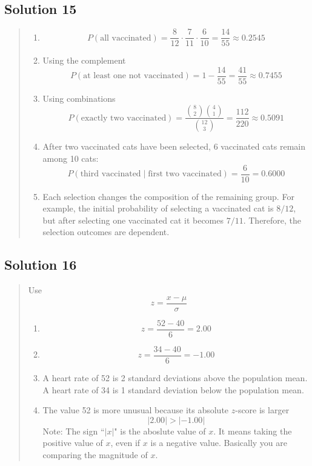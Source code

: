 \documentclass[10pt,letterpaper]{article}
\newcommand{\solutionheading}[1]{%
  \subsection*{Solution #1}
}
\newenvironment{answer}{%
  \begin{quote}\small\color{black}
}{%
  \end{quote}
}
\begin{document}
\solutionheading{15}
\begin{answer}
\begin{enumerate}
	\item
	$$P(\text{all vaccinated})=\frac{8}{12}\cdot\frac{7}{11}\cdot\frac{6}{10}=\frac{14}{55}\approx0.2545$$
	\item Using the complement
	$$P(\text{at least one not vaccinated})=1-\frac{14}{55}=\frac{41}{55}\approx0.7455$$
  	\item Using combinations
	$$P(\text{exactly two vaccinated})=\frac{\binom82\binom41}{\binom{12}{3}}=\frac{112}{220}\approx0.5091$$
  	\item After two vaccinated cats have been selected, 6 vaccinated cats remain among 10 cats:
	$$P(\text{third vaccinated}\mid\text{first two vaccinated})=\frac{6}{10}=0.6000$$
	\item Each selection changes the composition of the remaining group. For example, the initial probability of selecting a vaccinated cat is $8/12$, but after selecting one vaccinated cat it becomes $7/11$. Therefore, the selection outcomes are dependent.
\end{enumerate}
\end{answer}

\solutionheading{16}
\begin{answer}
Use
$$z=\frac{x-\mu}{\sigma}$$
\begin{enumerate}
	\item
	$$z=\frac{52-40}{6}=2.00$$		
	\item
	$$ z=\frac{34-40}{6}=-1.00$$
	\item A heart rate of 52 is 2 standard deviations above the population mean. A heart rate of 34 is 1 standard deviation below the population mean.
	\item The value 52 is more unusual because its absolute $z$-score is larger
	$$|2.00|>|-1.00|$$
	Note: The sign ``$|x|$" is the aboslute value of $x$. It means taking the positive value of $x$, even if $x$ is a negative value. Basically you are comparing the magnitude of $x$.
\end{enumerate}
\end{answer}
\end{document}
